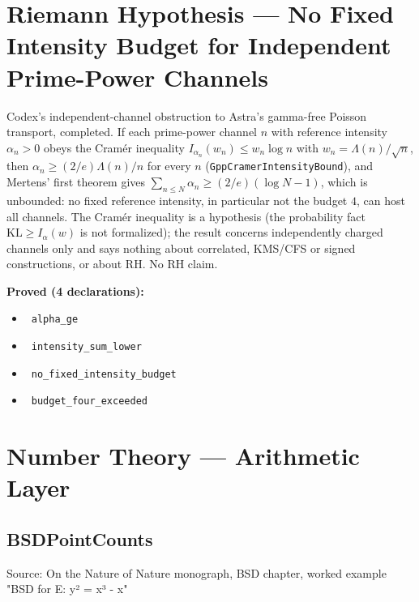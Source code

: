 \documentclass{report}
\theoremstyle{definition}
\begin{document}
\begin{itemize}
\begin{itemize}
\section{Riemann Hypothesis --- No Fixed Intensity Budget for Independent Prime-Power Channels}
Codex's independent-channel obstruction to Astra's gamma-free Poisson transport, completed. If each prime-power channel $n$ with reference intensity $\alpha_n>0$ obeys the Cram\'er inequality $I_{\alpha_n}(w_n)\le w_n\log n$ with $w_n=\Lambda(n)/\sqrt n$, then $\alpha_n\ge(2/e)\Lambda(n)/n$ for every $n$ (\texttt{GppCramerIntensityBound}), and Mertens' first theorem gives $\sum_{n\le N}\alpha_n\ge(2/e)(\log N-1)$, which is unbounded: no fixed reference intensity, in particular not the budget $4$, can host all channels. The Cram\'er inequality is a hypothesis (the probability fact $\mathrm{KL}\ge I_\alpha(w)$ is not formalized); the result concerns independently charged channels only and says nothing about correlated, KMS/CFS or signed constructions, or about RH. No RH claim.

\noindent\textbf{Proved (4 declarations):}
\begin{itemize}
  \item {}\leanok\ \texttt{alpha\_ge}
  \item {}\leanok\ \texttt{intensity\_sum\_lower}
  \item {}\leanok\ \texttt{no\_fixed\_intensity\_budget}
  \item {}\leanok\ \texttt{budget\_four\_exceeded}
\end{itemize}

\section{Number Theory --- Arithmetic Layer}

\subsection{BSDPointCounts}
Source: On the Nature of Nature monograph, BSD chapter, worked example "BSD for E: y² = x³ - x"


\end{itemize}
\end{itemize}
\end{document}
